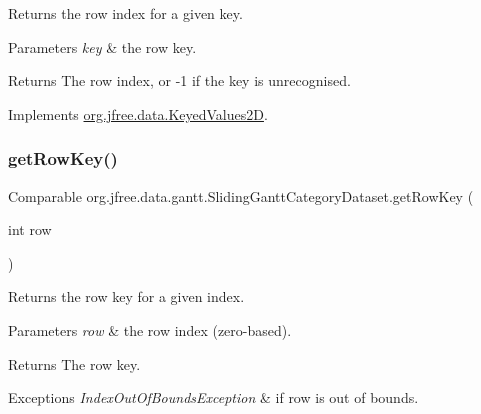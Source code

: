 Returns the row index for a given key.


\begin{DoxyParams}{Parameters}
{\em key} & the row key.\\
\hline
\end{DoxyParams}
\begin{DoxyReturn}{Returns}
The row index, or {\ttfamily -\/1} if the key is unrecognised. 
\end{DoxyReturn}


Implements \mbox{\hyperlink{interfaceorg_1_1jfree_1_1data_1_1_keyed_values2_d_ae92ded12999f2872687a5754ddf29254}{org.\+jfree.\+data.\+Keyed\+Values2D}}.

\mbox{\label{classorg_1_1jfree_1_1data_1_1gantt_1_1_sliding_gantt_category_dataset_abb1a58ac4db1497c2874e7a10e0f2026}} 
\subsubsection{\texorpdfstring{get\+Row\+Key()}{getRowKey()}}
{\footnotesize\ttfamily Comparable org.\+jfree.\+data.\+gantt.\+Sliding\+Gantt\+Category\+Dataset.\+get\+Row\+Key (\begin{DoxyParamCaption}\item[{int}]{row }\end{DoxyParamCaption})}

Returns the row key for a given index.


\begin{DoxyParams}{Parameters}
{\em row} & the row index (zero-\/based).\\
\hline
\end{DoxyParams}
\begin{DoxyReturn}{Returns}
The row key.
\end{DoxyReturn}

\begin{DoxyExceptions}{Exceptions}
{\em Index\+Out\+Of\+Bounds\+Exception} & if {\ttfamily row} is out of bounds. \\
\hline
\end{DoxyExceptions}


